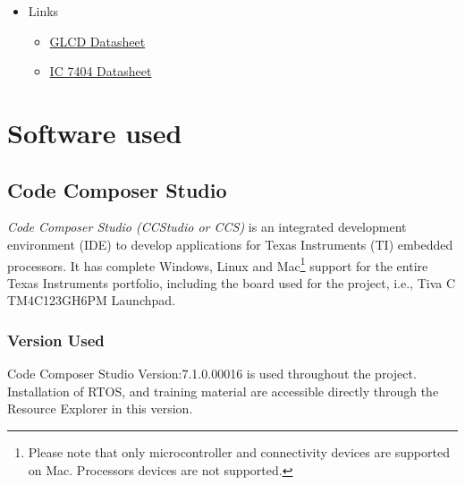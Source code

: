 \documentclass[a4paper,12pt,oneside]{book}
\begin{document}
\begin{itemize}
\begin{center}
  \end{center}
  \item Links
  \begin{itemize}
  \item 
  \href{https://www.engineersgarage.com/sites/default/files/Graphics\%20LCD\%20JHD12864E\%20Datasheet.pdf}{GLCD Datasheet}
  \item
  \href{https://www.engineersgarage.com/sites/default/files/74LS04.pdf}{IC 7404 Datasheet}
  \end{itemize} 
\end{itemize}

\chapter{Software used}
\section{Code Composer Studio}
\qquad \textit{Code Composer Studio (CCStudio or CCS)} is an integrated development environment (IDE) to develop applications for Texas Instruments (TI) embedded processors. It has complete Windows, Linux and Mac\footnote[1]{Please note that only microcontroller and connectivity devices are supported on Mac. Processors devices are not supported.} support for the entire Texas Instruments portfolio, including the board used for the project, i.e., Tiva C TM4C123GH6PM Launchpad.
\subsection{Version Used}
\qquad Code Composer Studio Version:7.1.0.00016 is used throughout the project. Installation of RTOS, and training material are accessible directly through the Resource Explorer in this version.
\end{document}
